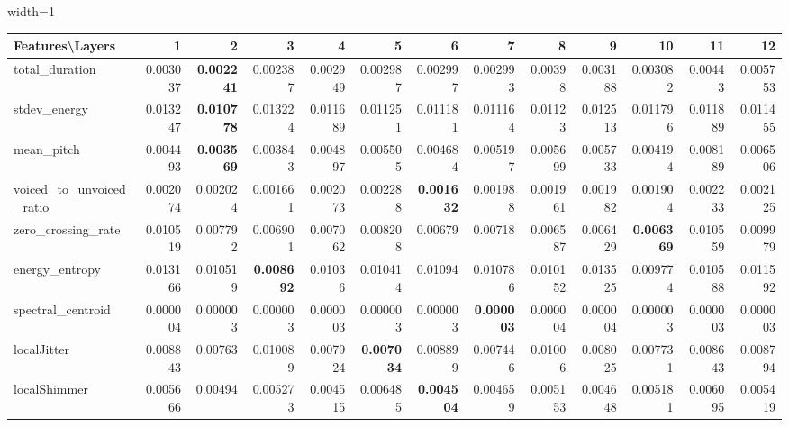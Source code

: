 \documentclass[sigconf]{acmart}
\newcommand{\wv}{wav2vec2.0\xspace}
\begin{document}
\begin{table*}[]
\begin{adjustbox}{width=1\textwidth}
\begin{tabular}{@{}l|rrrrrrrrrrrr@{}}
\toprule
\textbf{Features\textbackslash{}Layers} & 1 & 2 & 3 & 4 & 5 & 6 & 7 & 8 & 9 & 10 & 11 & 12 \\ \midrule
total\_duration & 0.003037 & \textbf{0.002241} & 0.002387 & 0.002949 & 0.002987 & 0.002997 & 0.002993 & 0.00398 & 0.003188 & 0.003082 & 0.00443 & 0.005753 \\
stdev\_energy & 0.013247 & \textbf{0.010778} & 0.013224 & 0.011689 & 0.011251 & 0.011181 & 0.011164 & 0.01123 & 0.012513 & 0.011796 & 0.011889 & 0.011455 \\
mean\_pitch & 0.004493 & \textbf{0.003569} & 0.003843 & 0.004897 & 0.005505 & 0.004684 & 0.005197 & 0.005699 & 0.005733 & 0.004194 & 0.008189 & 0.006506 \\
voiced\_to\_unvoiced\_ratio & 0.002074 & 0.002024 & 0.001661 & 0.002073 & 0.002288 & \textbf{0.001632} & 0.001988 & 0.001961 & 0.001982 & 0.001904 & 0.002233 & 0.002125 \\
zero\_crossing\_rate & 0.010519 & 0.007792 & 0.006901 & 0.007062 & 0.008208 & 0.00679 & 0.00718 & 0.006587 & 0.006429 & \textbf{0.006369} & 0.010559 & 0.009979 \\
energy\_entropy & 0.013166 & 0.010519 & \textbf{0.008692} & 0.01036 & 0.010414 & 0.01094 & 0.010786 & 0.010152 & 0.013525 & 0.009774 & 0.010588 & 0.011592 \\
spectral\_centroid & 0.000004 & 0.000003 & 0.000003 & 0.000003 & 0.000003 & 0.000003 & \textbf{0.000003} & 0.000004 & 0.000004 & 0.000003 & 0.000003 & 0.000003 \\
localJitter & 0.008843 & 0.00763 & 0.010089 & 0.007924 & \textbf{0.007034} & 0.008899 & 0.007446 & 0.01006 & 0.008025 & 0.007731 & 0.008643 & 0.008794 \\
localShimmer & 0.005666 & 0.00494 & 0.005273 & 0.004515 & 0.006485 & \textbf{0.004504} & 0.004659 & 0.005153 & 0.004648 & 0.005181 & 0.006095 & 0.005419
\\ \bottomrule
\end{tabular}
\end{adjustbox}
\vspace{1 mm}
\caption{\label{nAudio_W} \small  Results (MSE) for audio features on {\wv} for non-native read speech corpus (L2 Arctic)}

\end{table*}
\end{document}

